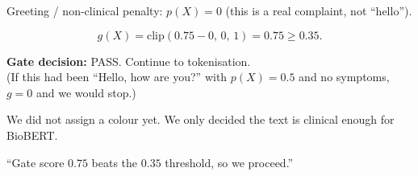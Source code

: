Greeting / non-clinical penalty: \(p(X)=0\) (this is a real complaint, not ``hello'').

\[
  g(X) = \mathrm{clip}(0.75 - 0,\, 0,\, 1) = 0.75 \ge 0.35.
\]

\begin{resultbox}
\textbf{Gate decision:} PASS. Continue to tokenisation.\\
(If this had been ``Hello, how are you?'' with \(p(X)=0.5\) and no symptoms, \(g=0\) and we would stop.)
\end{resultbox}

\begin{stepbox}
We did not assign a colour yet. We only decided the text is clinical enough for BioBERT.
\end{stepbox}

\begin{saybox}
``Gate score \(0.75\) beats the \(0.35\) threshold, so we proceed.''
\end{saybox}
